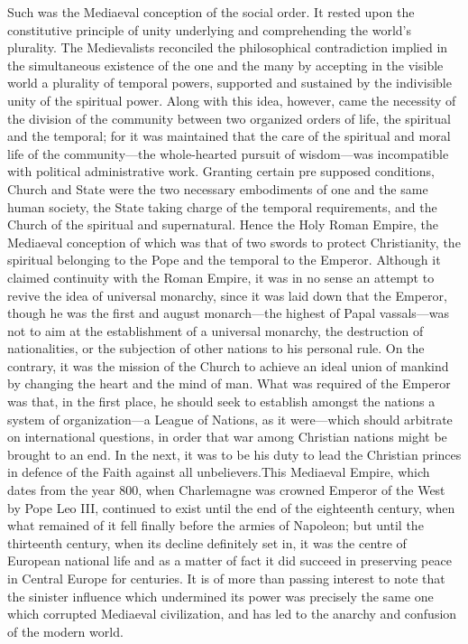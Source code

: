\documentclass{book}
\begin{document}
Such was the Mediaeval conception of the social order. It rested upon the constitutive principle of unity underlying and comprehending the world’s plurality. The Medievalists reconciled the philosophical contradiction implied in the simultaneous existence of the one and the many by accepting in the visible world a plurality of temporal powers, supported and sustained by the indivisible unity of the spiritual power. Along with this idea, however, came the necessity of the division of the community between two organized orders of life, the spiritual and the temporal; for it was maintained that the care of the spiritual and moral life of the community—the whole-hearted pursuit of wisdom—was incompatible with political administrative work. Granting certain pre supposed conditions, Church and State were the two necessary embodiments of one and the same human society, the State taking charge of the temporal requirements, and the Church of the spiritual and supernatural. Hence the Holy Roman Empire, the Mediaeval conception of which was that of two swords to protect Christianity, the spiritual belonging to the Pope and the temporal to the Emperor. Although it claimed continuity with the Roman Empire, it was in no sense an attempt to revive the idea of universal monarchy, since it was laid down that the Emperor, though he was the first and august monarch—the highest of Papal vassals—was not to aim at the establishment of a universal monarchy, the destruction of nationalities, or the subjection of other nations to his personal rule. On the contrary, it was the mission of the Church to achieve an ideal union of mankind by changing the heart and the mind of man. What was required of the Emperor was that, in the first place, he should seek to establish amongst the nations a system of organization—a League of Nations, as it were—which should arbitrate on international questions, in order that war among Christian nations might be brought to an end. In the next, it was to be his duty to lead the Christian princes in defence of the Faith against all unbelievers.\footnotemark[9] This Mediaeval Empire, which dates from the year 800, when Charlemagne was crowned Emperor of the West by Pope Leo III, continued to exist until the end of the eighteenth century, when what remained of it fell finally before the armies of Napoleon; but until the thirteenth century, when its decline definitely set in, it was the centre of European national life and as a matter of fact it did succeed in preserving peace in Central Europe for centuries. It is of more than passing interest to note that the sinister influence which undermined its power was precisely the same one which corrupted Mediaeval civilization, and has led to the anarchy and confusion of the modern world.
\end{document}
